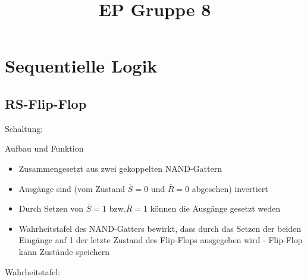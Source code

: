 \documentclass[compress,11pt]{beamer}
\title{EP Gruppe 8}
\begin{document}
\section{Sequentielle Logik}
\subsection{RS-Flip-Flop}
\begin{frame}
Schaltung:
\end{frame}
\begin{frame}

\begin{block}{Aufbau und Funktion}
\begin{itemize}
\item Zusammengesetzt aus zwei gekoppelten NAND-Gattern
\item Ausgänge sind (vom Zustand $\overline{S} = 0$ und $\overline{R} = 0$ abgesehen) invertiert
\item Durch Setzen von $\overline{S} = 1$ bzw.$\overline{R} = 1$ können die Ausgänge gesetzt weden
\item Wahrheitstafel des NAND-Gatters bewirkt, dass durch das Setzen der beiden Eingänge auf 1 der letzte Zustand des Flip-Flops ausgegeben wird - Flip-Flop kann Zustände speichern
\end{itemize}
\end{block}
\end{frame}

\begin{frame}
Wahrheitstafel:\\

\end{frame}
\end{document}
